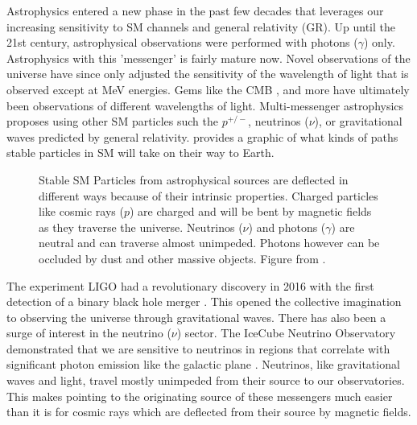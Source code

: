 Astrophysics entered a new phase in the past few decades that leverages our increasing sensitivity to SM channels and general relativity (GR).
Up until the 21st century, astrophysical observations were performed with photons ($\gamma$) only.
Astrophysics with this 'messenger' is fairly mature now.
Novel observations of the universe have since only adjusted the sensitivity of the wavelength of light that is observed except at MeV energies.
Gems like the CMB \cite{Plank:CMB}, and more have ultimately been observations of different wavelengths of light.
Multi-messenger astrophysics proposes using other SM particles such the $p^{+/-}$, neutrinos ($\nu$), or gravitational waves predicted by general relativity.
 provides a graphic of what kinds of paths stable particles in SM will take on their way to Earth.

\begin{figure}
    \caption{Stable SM Particles from astrophysical sources are deflected in different ways because of their intrinsic properties. Charged particles like cosmic rays ($p$) are charged and will be bent by magnetic fields as they traverse the universe. Neutrinos ($\nu$) and photons ($\gamma$) are neutral and can traverse almost unimpeded. Photons however can be occluded by dust and other massive objects. Figure from \cite{IceCube_SPGallery}.}
    \label{fig:astrophysics_particles}
\end{figure}

The experiment LIGO had a revolutionary discovery in 2016 with the first detection of a binary black hole merger \cite{2016:grav_waves}.
This opened the collective imagination to observing the universe through gravitational waves.
There has also been a surge of interest in the neutrino ($\nu$) sector.
The IceCube Neutrino Observatory demonstrated that we are sensitive to neutrinos in regions that correlate with significant photon emission like the galactic plane \cite{2023:IC3_galactic_plane}.
Neutrinos, like gravitational waves and light, travel mostly unimpeded from their source to our observatories.
This makes pointing to the originating source of these messengers much easier than it is for cosmic rays which are deflected from their source by magnetic fields.


